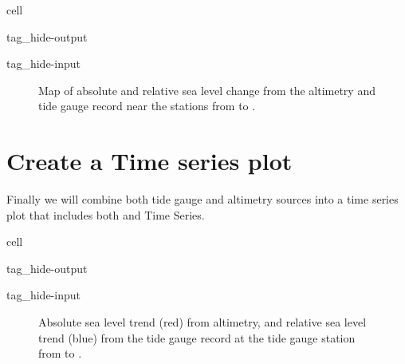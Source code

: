 \documentclass[letterpaper,10pt,english]{jupyterBook}
\begin{document}
\begin{sphinxuseclass}{cell}
\begin{sphinxuseclass}{tag_hide-output}
\begin{sphinxuseclass}{tag_hide-input}
\end{sphinxuseclass}
\end{sphinxuseclass}
\end{sphinxuseclass}
\begin{figure}[htbp]
\centering
\capstart

\noindent{}
\caption{Map of absolute and relative sea level change from the altimetry and tide gauge record near the  stations from  to .}\label{\detokenize{notebooks/regional_and_local/SL_Trend:fig-mag}}
\begin{sphinxlegend}
\sphinxAtStartPar
{}
\end{sphinxlegend}
\end{figure}


\section{Create a Time series plot}
\label{\detokenize{notebooks/regional_and_local/SL_Trend:create-a-time-series-plot}}\label{\detokenize{notebooks/regional_and_local/SL_Trend:id5}}
\sphinxAtStartPar
Finally we will combine both tide gauge and altimetry sources into a time series plot that includes both {\hyperref[\detokenize{notebooks/regional_and_local/SL_Trend:asltimeseries}]{}}  and {\hyperref[\detokenize{notebooks/regional_and_local/SL_Trend:rsltimeseries}]{}} Time Series.

\begin{sphinxuseclass}{cell}
\begin{sphinxuseclass}{tag_hide-output}
\begin{sphinxuseclass}{tag_hide-input}
\end{sphinxuseclass}
\end{sphinxuseclass}
\end{sphinxuseclass}
\begin{figure}[htbp]
\centering
\capstart

\noindent{}
\caption{Absolute sea level trend (red) from altimetry, and relative sea level trend (blue) from the tide gauge record at the  tide gauge station from  to .}\label{\detokenize{notebooks/regional_and_local/SL_Trend:trend-fig-station}}\end{figure}
\end{document}
